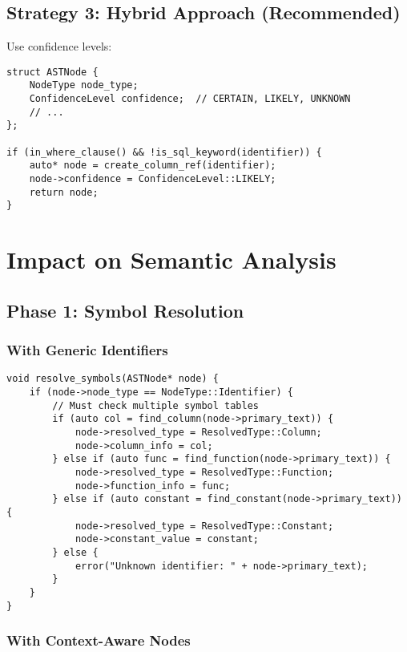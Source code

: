 \documentclass[11pt,a4paper]{article}
\begin{document}
\subsection{Strategy 3: Hybrid Approach (Recommended)}

Use confidence levels:

\begin{lstlisting}[style=cpp]
struct ASTNode {
    NodeType node_type;
    ConfidenceLevel confidence;  // CERTAIN, LIKELY, UNKNOWN
    // ...
};

if (in_where_clause() && !is_sql_keyword(identifier)) {
    auto* node = create_column_ref(identifier);
    node->confidence = ConfidenceLevel::LIKELY;
    return node;
}
\end{lstlisting}

\section{Impact on Semantic Analysis}

\subsection{Phase 1: Symbol Resolution}

\subsubsection{With Generic Identifiers}

\begin{lstlisting}[style=cpp]
void resolve_symbols(ASTNode* node) {
    if (node->node_type == NodeType::Identifier) {
        // Must check multiple symbol tables
        if (auto col = find_column(node->primary_text)) {
            node->resolved_type = ResolvedType::Column;
            node->column_info = col;
        } else if (auto func = find_function(node->primary_text)) {
            node->resolved_type = ResolvedType::Function;
            node->function_info = func;
        } else if (auto constant = find_constant(node->primary_text)) {
            node->resolved_type = ResolvedType::Constant;
            node->constant_value = constant;
        } else {
            error("Unknown identifier: " + node->primary_text);
        }
    }
}
\end{lstlisting}

\subsubsection{With Context-Aware Nodes}
\end{document}
